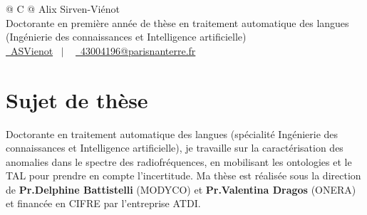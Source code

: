 \documentclass[a4paper,12pt]{article}
\begin{document}
\pagestyle{empty} 



\begin{tabularx}{\linewidth}{@{} C @{}}
\Huge{Alix Sirven-Viénot} \\[7.5pt] 
Doctorante en première année de thèse en traitement automatique des langues (Ingénierie des connaissances et Intelligence artificielle) \\
\href{https://github.com/ASVienot}{\raisebox{-0.05\height}\faGithub\ ASVienot} \ $|$ \ 
\href{mailto:43004196@parisnanterre.fr}{\raisebox{-0.05\height}\faEnvelope \ 43004196@parisnanterre.fr} \
\end{tabularx}


\section{Sujet de thèse}
Doctorante en traitement automatique des langues (spécialité Ingénierie des connaissances et Intelligence artificielle),
 je travaille sur la caractérisation des anomalies dans le spectre des radiofréquences, en mobilisant les ontologies et le TAL pour prendre en compte l'incertitude. 
Ma thèse est réalisée sous la direction de \textbf{Pr.Delphine Battistelli} (MODYCO) et \textbf{Pr.Valentina Dragos} (ONERA) et financée en CIFRE par l'entreprise ATDI.
\end{document}
